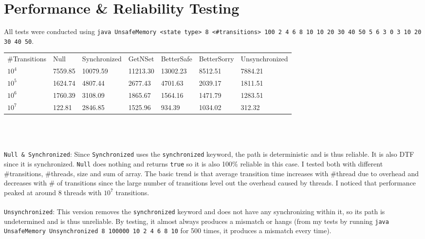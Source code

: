 \documentclass[10pt]{article}
\begin{document}
\section{Performance \& Reliability Testing}

All tests were conducted using \texttt{java UnsafeMemory <state type> 8 <\#transitions> 100 2 4 6 8 10 10 20 30 40 50 5 6 3 0 3 10 20 30 40 50}. \\

\begin{tabular}{ l | l | l | l | l | l | l | }
\#Transitions & Null & Synchronized & GetNSet & BetterSafe & BetterSorry & Unsynchronized \\
$10^4$ & 7559.85 & 10079.59 & 11213.30 & 13002.23 & 8512.51 & 7884.21 \\
$10^5$ & 1624.74 & 4807.44 & 2677.43 & 4701.63 & 2039.17 & 1811.51 \\
$10^6$ & 1760.39 & 3108.09 & 1865.67 & 1564.16 & 1471.79 & 1283.51  \\
$10^7$ & 122.81 & 2846.85 & 1525.96 & 934.39 & 1034.02 & 312.32  \\
\end{tabular} \\ \\ \\
\texttt{Null \& Synchronized}: Since \texttt{Synchronized} uses the \texttt{synchronized} keyword, the path is deterministic and is thus reliable. It is also DTF since it is synchronized. \texttt{Null} does nothing and returns \texttt{true} so it is also 100\% reliable in this case. I tested both with different \#transitions, \#threads, size and sum of array. The basic trend is that average transition time increases with \#thread due to overhead and decreases with \# of transitions since the large number of transitions level out the overhead caused by threads. I noticed that performance peaked at around 8 threads with $10^7$ transitions. \\ \\
\texttt{Unsynchronized}: This version removes the \texttt{synchronized} keyword and does not have any synchronizing within it, so its path is undetermined and is thus unreliable. By testing, it almost always produces a mismatch or hangs (from my tests by running \texttt{java UnsafeMemory Unsynchronized 8 100000 10 2 4 6 8 10}  for 500 times, it produces a mismatch every time). \\ \\
\end{document}

